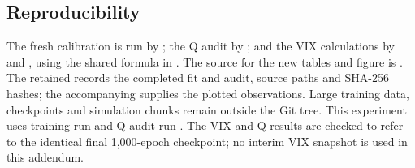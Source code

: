 \subsection{Reproducibility}
The fresh calibration is run by
; the Q audit by
; and the VIX calculations by
 and
, using the shared formula in
.
The source for the new tables and figure is
.
The retained  records the completed
fit and audit, source paths and SHA-256 hashes; the accompanying
 supplies the plotted observations. Large training
data, checkpoints and simulation chunks remain outside the Git tree.
This experiment uses training run  and Q-audit
run . The VIX and Q results are checked
to refer to the identical final 1,000-epoch checkpoint; no interim VIX
snapshot is used in this addendum.
